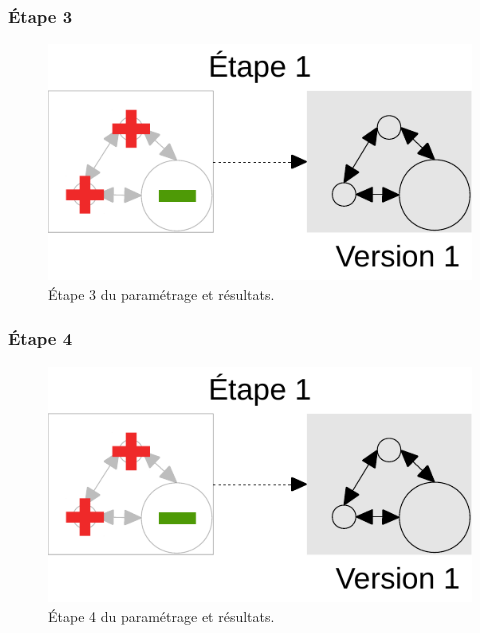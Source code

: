 \pagebreak
\subsubsection{Étape 3}
\begin{figure}[H]
	\centering
	\includegraphics[width = \linewidth, page = 3]{img/schemas_etapes_individuelles.pdf}
	\caption{Étape 3 du paramétrage et résultats.}
\end{figure}

\pagebreak
\subsubsection{Étape 4}
\begin{figure}[H]
	\centering
	\includegraphics[width = \linewidth, page = 4]{img/schemas_etapes_individuelles.pdf}
	\caption{Étape 4 du paramétrage et résultats.}
\end{figure}

\pagebreak
